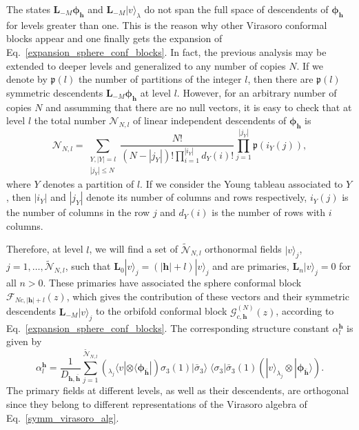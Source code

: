 \documentclass[a4paper,11pt]{article}
\begin{document}
The states $\boldsymbol{L}_{-M}\boldsymbol{\phi}_{\boldsymbol{h}}$ and $\boldsymbol{L}_{-M} |v\rangle_{\lambda}$ 
do not span the full space of descendents of $\boldsymbol{\phi}_{\boldsymbol{h}}$ for levels greater than one. 
This is the reason why other Virasoro conformal blocks appear and one finally gets the expansion of Eq.~\eqref{expansion_sphere_conf_blocks}. 
In fact, the previous analysis may be extended to deeper levels and generalized to any number of copies $N$.
If we denote by $\mathfrak{p}(l)$ the number of partitions of the integer $l$, then there are $\mathfrak{p}(l)$ symmetric
descendents $\boldsymbol{L}_{-M}\boldsymbol{\phi}_{\boldsymbol{h}}$ at level $l$. However,
for an arbitrary number of copies $N$ and assumming that there are no null vectors, it is easy to check that 
at level $l$ the total number $\mathcal{N}_{N, l}$ of linear independent descendents of $\boldsymbol{\phi}_{\boldsymbol{h}}$ is
\begin{equation}
 \mathcal{N}_{N, l}=\sum_{\substack{Y, |Y|=l \\ |j_Y|\leq N}}\frac{N!}{(N-|j_Y|)!
 \prod_{i=1}^{|i_Y|}d_Y(i)!}\prod_{j=1}^{|j_Y|}\mathfrak{p}(i_Y(j)),
\end{equation}
where $Y$ denotes a partition of $l$. If we consider the Young tableau
associated to $Y$, then $|i_Y|$ and  $|j_Y|$ denote its number of columns and
rows respectively, $i_Y(j)$ is the number of columns in the row $j$ and 
$d_Y(i)$ is the number of rows with $i$ columns.

Therefore, at level $l$, we will find a set of $\tilde{\mathcal{N}}_{N,l}$ orthonormal fields 
$|v\rangle_j$, $j=1,\dots, \tilde{\mathcal{N}}_{N,l}$,
such that $\boldsymbol{L}_0 |v\rangle_j=(|\boldsymbol{h}|+l)|v\rangle_j$ and are primaries,
$\boldsymbol{L}_n|v\rangle_j=0$ for all $n>0$. These primaries have associated the 
sphere conformal block $\mathcal{F}_{Nc, |\boldsymbol{h}|+l}(z)$, which gives the 
contribution of these vectors and their symmetric descendents $\boldsymbol{L}_{-M}|v\rangle_j$
to the orbifold conformal block $\mathcal{G}_{c, \boldsymbol{h}}^{(N)}(z)$, 
according to Eq.~\eqref{expansion_sphere_conf_blocks}. The corresponding structure constant $\alpha_l^{\boldsymbol{h}}$
is given by
\begin{equation}\label{alpha_l}
 \alpha_l^{\boldsymbol{h}}=\frac{1}{D_{\boldsymbol{h},\boldsymbol{\bar{h}}}}\sum_{j=1}^{\tilde{\mathcal{N}}_{N,l}}
 (_{\lambda_j}\langle v |\otimes \langle \boldsymbol{\phi}_{\boldsymbol{\bar{h}}}|)\sigma_{3}(1)|\bar{\sigma}_3\rangle \;\langle \sigma_{3}|\bar{\sigma}_3(1) (|v\rangle_{\lambda_j}\otimes |\boldsymbol{\phi}_{\boldsymbol{\bar{h}}}\rangle).
\end{equation}
The primary fields at 
different levels, as well as their descendents, are orthogonal
since they belong to different representations of the Virasoro algebra of Eq.~\eqref{symm_virasoro_alg}.
\end{document}
